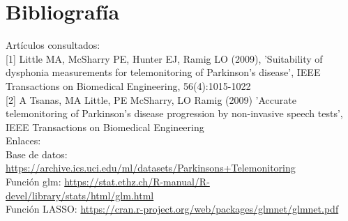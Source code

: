 \newpage

\section{Bibliografía}

Artículos consultados:\\

[1] Little MA, McSharry PE, Hunter EJ, Ramig LO (2009), 
'Suitability of dysphonia measurements for telemonitoring of Parkinson's disease', 
IEEE Transactions on Biomedical Engineering, 56(4):1015-1022 \\

[2] A Tsanas, MA Little, PE McSharry, LO Ramig (2009) 
'Accurate telemonitoring of Parkinson’s disease progression by non-invasive speech tests', 
IEEE Transactions on Biomedical Engineering\\

Enlaces:\\

Base de datos: \url{https://archive.ics.uci.edu/ml/datasets/Parkinsons+Telemonitoring}\\

Función glm: \url{https://stat.ethz.ch/R-manual/R-devel/library/stats/html/glm.html}\\

Función LASSO: \url{https://cran.r-project.org/web/packages/glmnet/glmnet.pdf}\\

